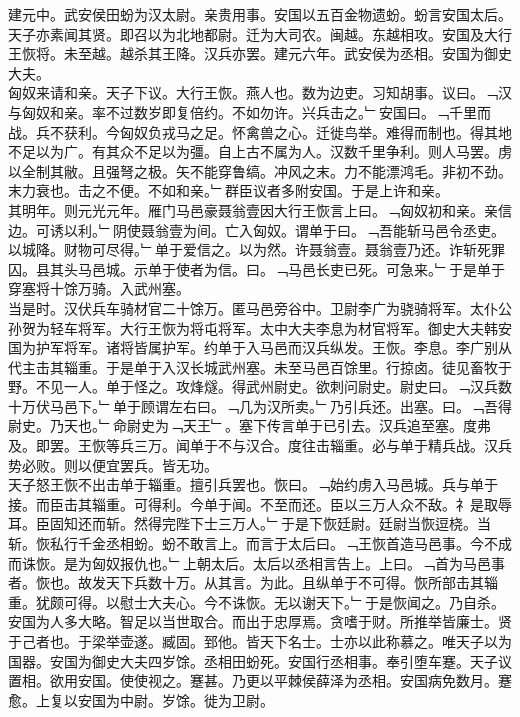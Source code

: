 \documentclass{zhvt-classic}
\begin{document}
\hspace*{2em}建元中。武安侯田蚡为汉太尉。亲贵用事。安国以五百金物遗蚡。蚡言安国太后。天子亦素闻其贤。即召以为北地都尉。迁为大司农。闽越。东越相攻。安国及大行王恢将。未至越。越杀其王降。汉兵亦罢。建元六年。武安侯为丞相。安国为御史大夫。\\
\hspace*{2em}匈奴来请和亲。天子下议。大行王恢。燕人也。数为边吏。习知胡事。议曰。﹁汉与匈奴和亲。率不过数岁即复倍约。不如勿许。兴兵击之。﹂安国曰。﹁千里而战。兵不获利。今匈奴负戎马之足。怀禽兽之心。迁徙鸟举。难得而制也。得其地不足以为广。有其众不足以为彊。自上古不属为人。汉数千里争利。则人马罢。虏以全制其敝。且强弩之极。矢不能穿鲁缟。冲风之末。力不能漂鸿毛。非初不劲。末力衰也。击之不便。不如和亲。﹂群臣议者多附安国。于是上许和亲。\\
\hspace*{2em}其明年。则元光元年。雁门马邑豪聂翁壹因大行王恢言上曰。﹁匈奴初和亲。亲信边。可诱以利。﹂阴使聂翁壹为间。亡入匈奴。谓单于曰。﹁吾能斩马邑令丞吏。以城降。财物可尽得。﹂单于爱信之。以为然。许聂翁壹。聂翁壹乃还。诈斩死罪囚。县其头马邑城。示单于使者为信。曰。﹁马邑长吏已死。可急来。﹂于是单于穿塞将十馀万骑。入武州塞。\\
\hspace*{2em}当是时。汉伏兵车骑材官二十馀万。匿马邑旁谷中。卫尉李广为骁骑将军。太仆公孙贺为轻车将军。大行王恢为将屯将军。太中大夫李息为材官将军。御史大夫韩安国为护军将军。诸将皆属护军。约单于入马邑而汉兵纵发。王恢。李息。李广别从代主击其辎重。于是单于入汉长城武州塞。未至马邑百馀里。行掠卤。徒见畜牧于野。不见一人。单于怪之。攻烽燧。得武州尉史。欲刺问尉史。尉史曰。﹁汉兵数十万伏马邑下。﹂单于顾谓左右曰。﹁几为汉所卖。﹂乃引兵还。出塞。曰。﹁吾得尉史。乃天也。﹂命尉史为﹁天王﹂。塞下传言单于已引去。汉兵追至塞。度弗及。即罢。王恢等兵三万。闻单于不与汉合。度往击辎重。必与单于精兵战。汉兵势必败。则以便宜罢兵。皆无功。\\
\hspace*{2em}天子怒王恢不出击单于辎重。擅引兵罢也。恢曰。﹁始约虏入马邑城。兵与单于接。而臣击其辎重。可得利。今单于闻。不至而还。臣以三万人众不敌。礻是取辱耳。臣固知还而斩。然得完陛下士三万人。﹂于是下恢廷尉。廷尉当恢逗桡。当斩。恢私行千金丞相蚡。蚡不敢言上。而言于太后曰。﹁王恢首造马邑事。今不成而诛恢。是为匈奴报仇也。﹂上朝太后。太后以丞相言告上。上曰。﹁首为马邑事者。恢也。故发天下兵数十万。从其言。为此。且纵单于不可得。恢所部击其辎重。犹颇可得。以慰士大夫心。今不诛恢。无以谢天下。﹂于是恢闻之。乃自杀。\\
\hspace*{2em}安国为人多大略。智足以当世取合。而出于忠厚焉。贪嗜于财。所推举皆廉士。贤于己者也。于梁举壶遂。臧固。郅他。皆天下名士。士亦以此称慕之。唯天子以为国器。安国为御史大夫四岁馀。丞相田蚡死。安国行丞相事。奉引堕车蹇。天子议置相。欲用安国。使使视之。蹇甚。乃更以平棘侯薛泽为丞相。安国病免数月。蹇愈。上复以安国为中尉。岁馀。徙为卫尉。\\
\end{document}
